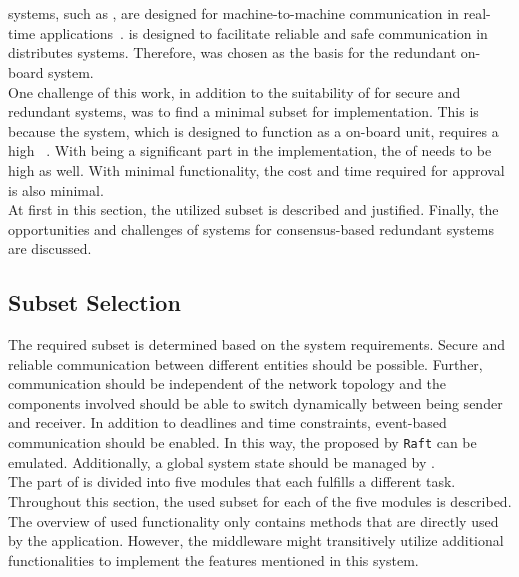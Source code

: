 \section{}

 systems, such as , are designed for machine-to-machine communication in real-time applications~\cite{omgDDSspec}.
 is designed to facilitate reliable and safe communication in distributes systems.
Therefore,  was chosen as the basis for the redundant on-board system.
\\

One challenge of this work, in addition to the suitability of  for secure and redundant systems, was to find a minimal subset for implementation.
This is because the system, which is designed to function as a  on-board unit, requires a high ~\cite{ChakrabortyFaultTolerantRailway}.
With  being a significant part in the implementation, the  of  needs to be high as well.
With minimal functionality, the cost and time required for approval is also minimal.
\\

At first in this section, the utilized  subset is described and justified.
Finally, the opportunities and challenges of  systems for consensus-based redundant systems are discussed.

\subsection{Subset Selection}

The required subset is determined based on the system requirements.
Secure and reliable communication between different entities should be possible.
Further, communication should be independent of the network topology and the components involved should be able to switch dynamically between being sender and receiver.
In addition to deadlines and time constraints, event-based communication should be enabled.
In this way, the  proposed by \texttt{Raft} can be emulated.
Additionally, a global system state should be managed by .
\\

The  part of  is divided into five modules that each fulfills a different task.
Throughout this section, the used subset for each of the five modules is described.
\\

The overview of used functionality only contains methods that are directly used by the application.
However, the middleware might transitively utilize additional functionalities to implement the features mentioned in this system.

